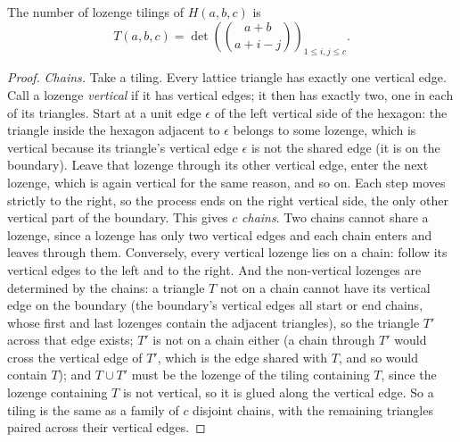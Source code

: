\begin{theorem}\label{thm:lozenge}
The number of lozenge tilings of $H(a,b,c)$ is
\[
T(a,b,c)=\det\left(\binom{a+b}{a+i-j}\right)_{1\le i,j\le c}.
\]
\end{theorem}
\begin{proof}
\emph{Chains.} Take a tiling. Every lattice triangle has exactly one vertical edge. Call a lozenge \emph{vertical} if
it has vertical edges; it then has exactly two, one in each of its triangles. Start at a unit edge $\epsilon$ of the left
vertical side of the hexagon: the triangle inside the hexagon adjacent to $\epsilon$ belongs to some lozenge, which is
vertical because its triangle's vertical edge $\epsilon$ is not the shared edge (it is on the boundary). Leave that
lozenge through its other vertical edge, enter the next lozenge, which is again vertical for the same reason, and so on.
Each step moves strictly to the right, so the process ends on the right vertical side, the only other vertical part of
the boundary. This gives $c$ \emph{chains}. Two chains cannot share a lozenge, since a lozenge has only two vertical
edges and each chain enters and leaves through them. Conversely, every vertical lozenge lies on a chain: follow its
vertical edges to the left and to the right. And the non-vertical lozenges are determined by the chains: a triangle
$T$ not on a chain cannot have its vertical edge on the boundary (the boundary's vertical edges all start or end chains,
whose first and last lozenges contain the adjacent triangles), so the triangle $T'$ across that edge exists; $T'$ is not on a
chain either (a chain through $T'$ would cross the vertical edge of $T'$, which is the edge shared with $T$, and so would
contain $T$); and $T\cup T'$ must be the lozenge of the tiling containing $T$, since the lozenge containing $T$ is not
vertical, so it is glued along the vertical edge. So a tiling is the same as a family of $c$ disjoint chains, with the
remaining triangles paired across their vertical edges.


\end{proof}
